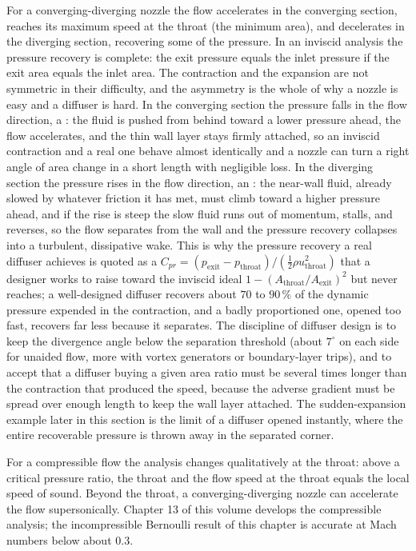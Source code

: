 For a converging-diverging nozzle the flow accelerates in the
converging section, reaches its maximum speed at the throat (the
minimum area), and decelerates in the diverging section, recovering
some of the pressure. In an inviscid analysis the pressure recovery
is complete: the exit pressure equals the inlet pressure if the
exit area equals the inlet area. The contraction and the expansion are
not symmetric in their difficulty, and the asymmetry is the whole of
why a nozzle is easy and a diffuser is hard. In the converging section
the pressure falls in the flow direction, a : the fluid is pushed from behind toward a lower
pressure ahead, the flow accelerates, and the thin wall layer stays
firmly attached, so an inviscid contraction and a real one behave
almost identically and a nozzle can turn a right angle of area change
in a short length with negligible loss. In the diverging section the
pressure rises in the flow direction, an : the near-wall fluid, already slowed by whatever friction it
has met, must climb toward a higher pressure ahead, and if the rise is
steep the slow fluid runs out of momentum, stalls, and reverses, so the
flow separates from the wall and the pressure recovery collapses into a
turbulent, dissipative wake. This is why the pressure recovery a real
diffuser achieves is quoted as a  $C_{pr} = (p_\text{exit} - p_\text{throat})/(\tfrac12\rho
u_\text{throat}^2)$ that a designer works to raise toward the inviscid
ideal $1 - (A_\text{throat}/A_\text{exit})^2$ but never reaches; a
well-designed diffuser recovers about $70$ to $90\,\%$ of the dynamic
pressure expended in the contraction, and a badly proportioned one,
opened too fast, recovers far less because it separates. The discipline
of diffuser design is to keep the divergence angle below the separation
threshold (about $7^{\circ}$ on each side for unaided flow, more with
vortex generators or boundary-layer trips), and to accept that a
diffuser buying a given area ratio must be several times longer than the
contraction that produced the speed, because the adverse gradient must
be spread over enough length to keep the wall layer attached. The
sudden-expansion example later in this section is the limit of a
diffuser opened instantly, where the entire recoverable pressure is
thrown away in the separated corner.

For a compressible flow the analysis changes qualitatively at the
throat: above a critical pressure ratio, the throat  and the flow speed at the throat equals the local speed of
sound. Beyond the throat, a converging-diverging nozzle can
accelerate the flow supersonically. Chapter 13 of this volume
develops the compressible analysis; the incompressible Bernoulli
result of this chapter is accurate at Mach numbers below about
$0.3$.


